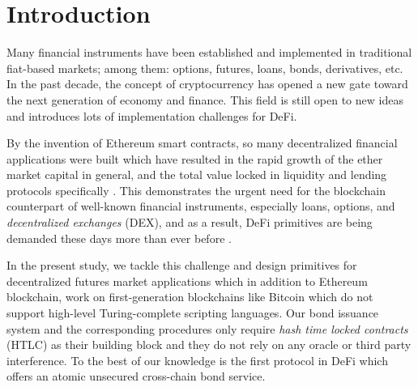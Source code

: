 \section{Introduction}
\label{sec:w-motiv}

Many financial instruments have been established and implemented in traditional fiat-based markets; 
among them: options, futures, loans, bonds, derivatives, etc. In the past decade, the concept of cryptocurrency has opened a new gate toward the next generation of economy and finance. This field is still open to new ideas and introduces lots of implementation challenges for DeFi. 

By the invention of Ethereum smart contracts, so many decentralized financial applications were built which have resulted in the rapid growth of the ether market capital in general, and the total value locked in liquidity and lending protocols specifically . This demonstrates the urgent need for the blockchain counterpart of well-known financial instruments, especially loans, options, and \emph{decentralized exchanges} (DEX), and as a result, DeFi primitives are being demanded these days more than ever before . 

In the present study, we tackle this challenge and design primitives for decentralized futures market applications which in addition to Ethereum blockchain, work on first-generation blockchains like Bitcoin which do not support high-level Turing-complete scripting languages. Our bond issuance system and the corresponding procedures only require \emph{hash time locked contracts} (HTLC) as their building block and they do not rely on any oracle or third party interference. To the best of our knowledge \abcd is the first protocol in DeFi which offers an atomic unsecured cross-chain bond service.

